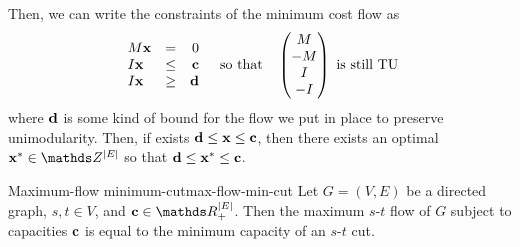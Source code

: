 \documentclass[12pt]{extarticle}
\renewcommand{\vec}[1]{\bvec{#1}}
\begin{document}
Then, we can write the constraints of the minimum cost flow as
\begin{equation}
	\begin{array}{lcr}
		M \vec x & =    & 0      \\
		I \vec x & \leq & \vec c \\
		I \vec x & \geq & \vec d
	\end{array} \quad \text{so that} \quad
	\begin{pmatrix}
		M  \\
		-M \\
		I  \\
		-I
	\end{pmatrix} \text{ is still TU}
\end{equation}
where $\vec d$ is some kind of bound for the flow we put in place to preserve unimodularity.
Then, if exists $\vec d \leq \vec x \leq \vec c$, then there exists an optimal
$\vec x^* \in \Z^{\abs{E}}$ so that $\vec d \leq \vec x^* \leq \vec c$.

\begin{theorem}{Maximum-flow minimum-cut}{max-flow-min-cut}
	Let $G = (V, E)$ be a directed graph, $s, t \in V$, and $\vec c \in \R^\abs{E}_+$.
	Then the maximum $s$-$t$ flow of $G$ subject to capacities $\vec c$ is equal to the minimum
	capacity of an $s$-$t$ cut.
\end{theorem}
\end{document}
